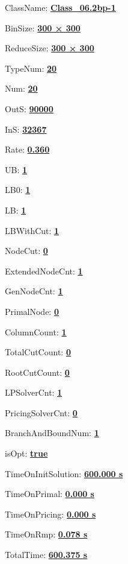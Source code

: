 \documentclass[11pt]{article}
\begin{document}
\pagestyle{empty}


ClassName: \underline{\textbf{Class_06.2bp-1}}
\par
BinSize: \underline{\textbf{300 × 300}}
\par
ReduceSize: \underline{\textbf{300 × 300}}
\par
TypeNum: \underline{\textbf{20}}
\par
Num: \underline{\textbf{20}}
\par
OutS: \underline{\textbf{90000}}
\par
InS: \underline{\textbf{32367}}
\par
Rate: \underline{\textbf{0.360}}
\par
UB: \underline{\textbf{1}}
\par
LB0: \underline{\textbf{1}}
\par
LB: \underline{\textbf{1}}
\par
LBWithCut: \underline{\textbf{1}}
\par
NodeCut: \underline{\textbf{0}}
\par
ExtendedNodeCnt: \underline{\textbf{1}}
\par
GenNodeCnt: \underline{\textbf{1}}
\par
PrimalNode: \underline{\textbf{0}}
\par
ColumnCount: \underline{\textbf{1}}
\par
TotalCutCount: \underline{\textbf{0}}
\par
RootCutCount: \underline{\textbf{0}}
\par
LPSolverCnt: \underline{\textbf{1}}
\par
PricingSolverCnt: \underline{\textbf{0}}
\par
BranchAndBoundNum: \underline{\textbf{1}}
\par
isOpt: \underline{\textbf{true}}
\par
TimeOnInitSolution: \underline{\textbf{600.000 s}}
\par
TimeOnPrimal: \underline{\textbf{0.000 s}}
\par
TimeOnPricing: \underline{\textbf{0.000 s}}
\par
TimeOnRmp: \underline{\textbf{0.078 s}}
\par
TotalTime: \underline{\textbf{600.375 s}}
\par
\newpage
\end{document}
